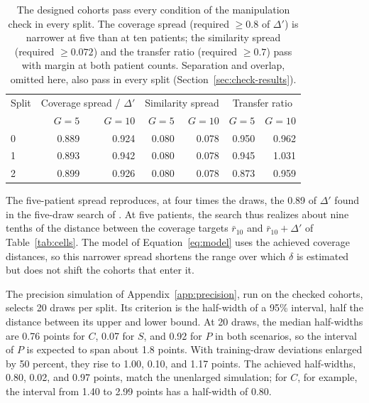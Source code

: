 \begin{table}[htbp]
\centering
\renewcommand{\arraystretch}{1.15}
\begin{tabularx}{\textwidth}{@{}lrrrrrr@{}}
\toprule
Split & \multicolumn{2}{c}{Coverage spread / $\Delta'$} & \multicolumn{2}{c}{Similarity spread} & \multicolumn{2}{c}{Transfer ratio} \\
 & $G=5$ & $G=10$ & $G=5$ & $G=10$ & $G=5$ & $G=10$ \\
\midrule
0 & 0.889 & 0.924 & 0.080 & 0.078 & 0.950 & 0.962 \\
1 & 0.893 & 0.942 & 0.080 & 0.078 & 0.945 & 1.031 \\
2 & 0.899 & 0.926 & 0.080 & 0.078 & 0.873 & 0.959 \\
\bottomrule
\end{tabularx}
\caption{The designed cohorts pass every condition of the manipulation check in every split. The coverage spread (required $\ge0.8$ of $\Delta'$) is narrower at five than at ten patients; the similarity spread (required $\ge0.072$) and the transfer ratio (required $\ge0.7$) pass with margin at both patient counts. Separation and overlap, omitted here, also pass in every split (Section~\ref{sec:check-results}).}
\label{tab:results-check}
\end{table}

\noindent The five-patient spread reproduces, at four times the draws, the 0.89 of $\Delta'$ found in the five-draw search of \citet{queisler2026coverageSimilarity}. At five patients, the search thus realizes about nine tenths of the distance between the coverage targets $\bar r_{10}$ and $\bar r_{10}+\Delta'$ of Table~\ref{tab:cells}. The model of Equation~\eqref{eq:model} uses the achieved coverage distances, so this narrower spread shortens the range over which $\delta$ is estimated but does not shift the cohorts that enter it.

The precision simulation of Appendix~\ref{app:precision}, run on the checked cohorts, selects 20 draws per split. Its criterion is the half-width of a 95\% interval, half the distance between its upper and lower bound. At 20 draws, the median half-widths are 0.76 points for $C$, 0.07 for $S$, and 0.92 for $P$ in both scenarios, so the interval of $P$ is expected to span about 1.8 points. With training-draw deviations enlarged by 50 percent, they rise to 1.00, 0.10, and 1.17 points. The achieved half-widths, 0.80, 0.02, and 0.97 points, match the unenlarged simulation; for $C$, for example, the interval from 1.40 to 2.99 points has a half-width of 0.80.

